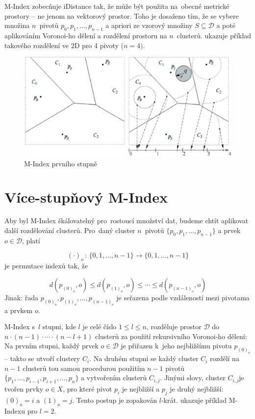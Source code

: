 M-Index zobecňuje iDistance tak, že může být použita na~obecné metrické
prostory -- ne jenom na vektorový prostor\@. Toho je dosaženo tím,
že se vybere množina $n$~pivotů $p_{0},p_{1},\ldots,p_{n-1}$ a
apriori ze vzorový množiny $S\subseteq\mathcal{D}$ a poté aplikováním
Voronoi-ho dělení a rozdělení prostoru na $n$~clusterů. ukazuje
příklad takového rozdělení ve 2D pro 4 pivoty ($n=4)$.

\begin{figure}[t]
\begin{centering}
\includegraphics[scale=0.5]{m-index-level-one}\caption{M-Index prvního stupně\label{fig:M-Index-level-one}}

\par\end{centering}

\end{figure}



\section{Více-stupňový M-Index}

Aby byl M-Index škálovatelný pro~rostoucí množství dat, budeme chtít
aplikovat další rozdělování clusterů. Pro~daný cluster $n$~pivotů
$\{p_{0},p_{1},\ldots,p_{n-1}\}$ a prvek $o\in\mathcal{D}$, platí

\[
(\cdot)_{o}\,:\,\{0,1,\ldots,n-1\}\rightarrow\{0,1,\ldots,n-1\}
\]
je permutace indexů tak, že

\[
d(p_{(0)_{o}},o)\leq d(p_{(1)_{o}},o)\leq\cdots\leq d(p_{(n-1)_{o}},o)
\]
Jinak: řada $p_{(0)_{o}},p_{(1)_{o}},\ldots,p_{(n-1)_{o}}$ je seřazena
podle vzdáleností mezi pivotama a prvkem $o$\@.

M-Index s~$l$ stupni, kde $l$ je celé číslo $1\leq l\leq n$, rozděluje
prostor $\mathcal{D}$ do $n\cdot(n-1)\cdot\cdots\cdot(n-l+1)$ clusterů
za použití rekursivního Voronoi-ho dělení: Na prvním stupni, každý
prvek $o\in\mathcal{D}$ je přiřazen k~jeho nejbližšímu pivotu $p_{(0)_{o}}$--
takto se utvoří clustery $C_{i}$\@. Na druhém stupni se každý cluster
$C_{i}$ rozdělí na $n-1$ clusterů tou samou procedurou použitím
$n-1$ pivotů $\{p_{1},\ldots,p_{i-1},p_{i+1},\ldots,p_{n}\}$ a vytvořením
clusterů $C_{i,j}$\@. Jinými slovy, cluster $C_{i,j}$je tvořen
prvky $o\in X$, pro které pivot $p_{i}$ je nejbližší a $p_{j}$
je druhý nejbližší: $(0)_{o}=i$ a $(1)_{o}=j$\@. Tento postup je
zopakován $l$-krát\@.  ukazuje
příklad M-Indexu pro $l=2$\@.


